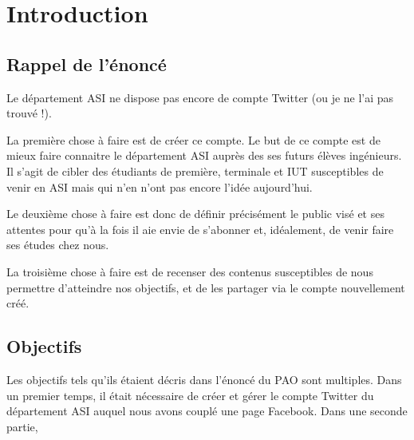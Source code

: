 \section{Introduction}

\subsection{Rappel de l'énoncé}
Le département ASI ne dispose pas encore de compte Twitter (ou je ne l'ai pas trouvé !).
 
La première chose à faire est de créer ce compte. Le but de ce compte est de mieux faire connaitre le département ASI auprès des 
ses futurs élèves ingénieurs. Il s'agit de cibler des étudiants de première, terminale et IUT susceptibles de venir en ASI mais qui 
n'en n'ont pas encore l'idée aujourd'hui. 
 
Le deuxième chose à faire est donc de définir précisément le public visé et ses attentes pour qu'à la fois il aie envie de s'abonner 
et, idéalement, de venir faire ses études chez nous.
 
La troisième chose à faire est de recenser des contenus susceptibles de nous permettre d'atteindre nos objectifs, et de les partager via 
le compte nouvellement créé. 

\subsection{Objectifs}
Les objectifs tels qu'ils étaient décris dans l'énoncé du PAO sont multiples. Dans un premier temps, il était nécessaire de créer et gérer le compte Twitter du département ASI auquel nous 
avons couplé une page Facebook. Dans une seconde partie, 

